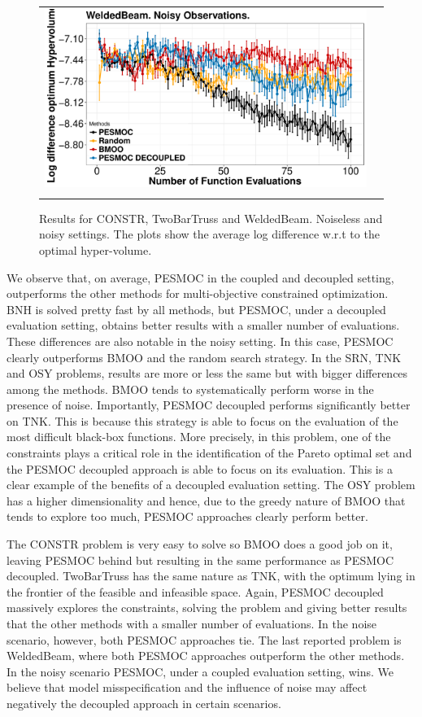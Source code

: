 \begin{figure}[H]
\begin{tabular}{cc}
                \includegraphics[width=0.475\linewidth]{Figures/benchmark/WeldedBeam_noisy.pdf} \\
                \vspace{-.1cm}
        \end{tabular}
        \caption{Results for CONSTR, TwoBarTruss and WeldedBeam. Noiseless
                and noisy settings. The plots show the average log difference w.r.t to the optimal hyper-volume.}
        \label{fig:benchmark_results_2}
\end{figure}

We observe that, on average, PESMOC in the coupled and decoupled setting, outperforms the other
methods for multi-objective constrained optimization. BNH is solved pretty fast by all methods,
but PESMOC, under a decoupled evaluation setting, obtains better results with a smaller number of evaluations.
These differences are also notable in the noisy setting. In this case, PESMOC clearly outperforms BMOO and the
random search strategy. In the SRN, TNK and OSY problems, results are more or less the same but with bigger
differences among the methods. BMOO tends to systematically perform worse in the presence of noise.
Importantly, PESMOC decoupled performs significantly better on TNK. This is because this
strategy is able to focus on the evaluation of the most difficult black-box functions.
More precisely, in this problem, one of the constraints plays a critical role in the
identification of the Pareto optimal set and the PESMOC decoupled approach is able to focus on
its evaluation. This is a clear example of the benefits of a decoupled evaluation setting.
The OSY problem has a higher dimensionality and hence, due to the greedy nature of BMOO that tends
to explore too much, PESMOC approaches clearly perform better.

The CONSTR problem is very easy to solve so BMOO does a good job on it, leaving PESMOC behind
but resulting in the same performance as PESMOC decoupled.  TwoBarTruss has the
same nature as TNK, with the optimum lying in the frontier of the feasible and infeasible space. Again,
PESMOC decoupled massively explores the constraints, solving the problem and giving better results that
the other methods with a smaller number of evaluations. In the noise scenario, however, both PESMOC
approaches tie. The last reported problem is WeldedBeam, where both PESMOC approaches outperform the other methods.
In the noisy scenario PESMOC, under a coupled evaluation setting, wins. We believe that model misspecification
and the influence of noise may affect negatively the decoupled approach in certain scenarios.

